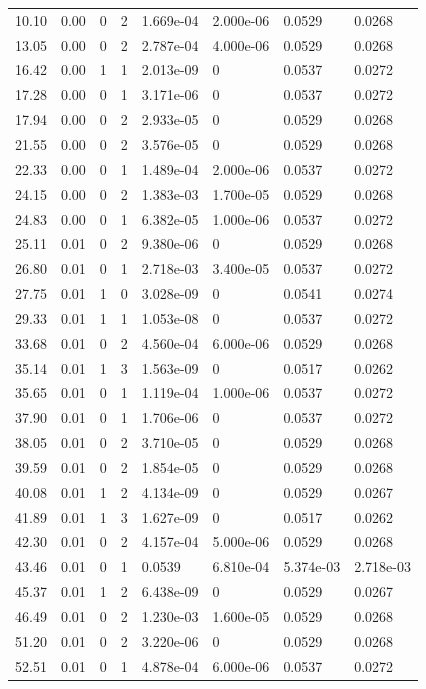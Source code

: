\documentclass[preview]{standalone}
\begin{document}
{{\begin{tabular}{L{1.2cm}C{1.2cm} C{0.3cm}C{0.5cm} C{1.4cm}C{1.4cm} C{1.4cm}C{1.4cm}}
  10.10  &  0.00  & 0     &  2 &  1.669e-04  & 2.000e-06  & 0.0529 &  0.0268   \\ 
  13.05  &  0.00  & 0     &  2 &  2.787e-04  & 4.000e-06  & 0.0529 &  0.0268   \\ 
  16.42  &  0.00  & 1     &  1 &  2.013e-09  & 0  & 0.0537 &  0.0272   \\ 
  17.28  &  0.00  & 0     &  1 &  3.171e-06  & 0  & 0.0537 &  0.0272   \\ 
  17.94  &  0.00  & 0     &  2 &  2.933e-05  & 0  & 0.0529 &  0.0268   \\ 
  21.55  &  0.00  & 0     &  2 &  3.576e-05  & 0  & 0.0529 &  0.0268   \\ 
  22.33  &  0.00  & 0     &  1 &  1.489e-04  & 2.000e-06  & 0.0537 &  0.0272   \\ 
  24.15  &  0.00  & 0     &  2 &  1.383e-03  & 1.700e-05  & 0.0529 &  0.0268   \\ 
  24.83  &  0.00  & 0     &  1 &  6.382e-05  & 1.000e-06  & 0.0537 &  0.0272   \\ 
  25.11  &  0.01  & 0     &  2 &  9.380e-06  & 0  & 0.0529 &  0.0268   \\ 
  26.80  &  0.01  & 0     &  1 &  2.718e-03  & 3.400e-05  & 0.0537 &  0.0272   \\ 
  27.75  &  0.01  & 1     &  0 &  3.028e-09  & 0  & 0.0541 &  0.0274   \\ 
  29.33  &  0.01  & 1     &  1 &  1.053e-08  & 0  & 0.0537 &  0.0272   \\ 
  33.68  &  0.01  & 0     &  2 &  4.560e-04  & 6.000e-06  & 0.0529 &  0.0268   \\ 
  35.14  &  0.01  & 1     &  3 &  1.563e-09  & 0  & 0.0517 &  0.0262   \\ 
  35.65  &  0.01  & 0     &  1 &  1.119e-04  & 1.000e-06  & 0.0537 &  0.0272   \\ 
  37.90  &  0.01  & 0     &  1 &  1.706e-06  & 0  & 0.0537 &  0.0272   \\ 
  38.05  &  0.01  & 0     &  2 &  3.710e-05  & 0  & 0.0529 &  0.0268   \\ 
  39.59  &  0.01  & 0     &  2 &  1.854e-05  & 0  & 0.0529 &  0.0268   \\ 
  40.08  &  0.01  & 1     &  2 &  4.134e-09  & 0  & 0.0529 &  0.0267   \\ 
  41.89  &  0.01  & 1     &  3 &  1.627e-09  & 0  & 0.0517 &  0.0262   \\ 
  42.30  &  0.01  & 0     &  2 &  4.157e-04  & 5.000e-06  & 0.0529 &  0.0268   \\ 
  43.46  &  0.01  & 0     &  1 &  0.0539  & 6.810e-04  & 5.374e-03 &  2.718e-03   \\ 
  45.37  &  0.01  & 1     &  2 &  6.438e-09  & 0  & 0.0529 &  0.0267   \\ 
  46.49  &  0.01  & 0     &  2 &  1.230e-03  & 1.600e-05  & 0.0529 &  0.0268   \\ 
  51.20  &  0.01  & 0     &  2 &  3.220e-06  & 0  & 0.0529 &  0.0268   \\ 
  52.51  &  0.01  & 0     &  1 &  4.878e-04  & 6.000e-06  & 0.0537 &  0.0272   \\ 
\hline 
\end{tabular} 

}}
\end{document}
